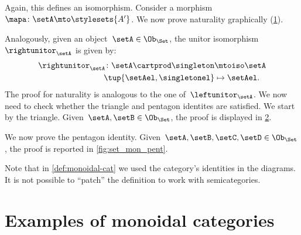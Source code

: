 \begin{example}
    Again, this defines an isomorphism.
    Consider a morphism~$\mapa\colon \setA\mto \stylesets{A'}$.
    We now prove naturality graphically (\cref{fig:monoidal_set_unit_nat}).

    \begin{figure}[h!]
        \centering
        \caption{}
        \label{fig:monoidal_set_unit_nat}
    \end{figure}

    Analogously, given an object~$\setA\in \Ob_{\Set}$, the unitor isomorphism~$\rightunitor_\setA$ is given by:
    \begin{equation*}
        \label{eq:set_mon_prod_5}
        \begin{aligned}
            \rightunitor_\setA\colon \setA\cartprod \singleton & \mtoiso \setA \\
            \tup{\setAel,\singletonel}                         & \mapsto \setAel.
        \end{aligned}
    \end{equation*}
    The proof for naturality is analogous to the one of~$\leftunitor_\setA$.
    We now need to check whether the triangle and pentagon identites are satisfied.
    We start by the triangle.
    Given~$\setA,\setB\in \Ob_{\Set}$, the proof is displayed in \cref{fig:set_mon_triangle}.

    \begin{figure}[h]
        \centering
        \caption{}
        \label{fig:set_mon_triangle}
    \end{figure}

    We now prove the pentagon identity.
    Given~$\setA,\setB,\setC,\setD\in \Ob_\Set$, the proof is reported in \cref{fig:set_mon_pent}.

    \begin{figure*}[h]
        \centering
        \caption{}
        \label{fig:set_mon_pent}
    \end{figure*}
\end{example}

\begin{remark}
    Note that in \cref{def:monoidal-cat} we used the category's identities in the diagrams.
    It is not possible to ``patch'' the definition to work with semicategories.
\end{remark}

\section{Examples of monoidal categories}

